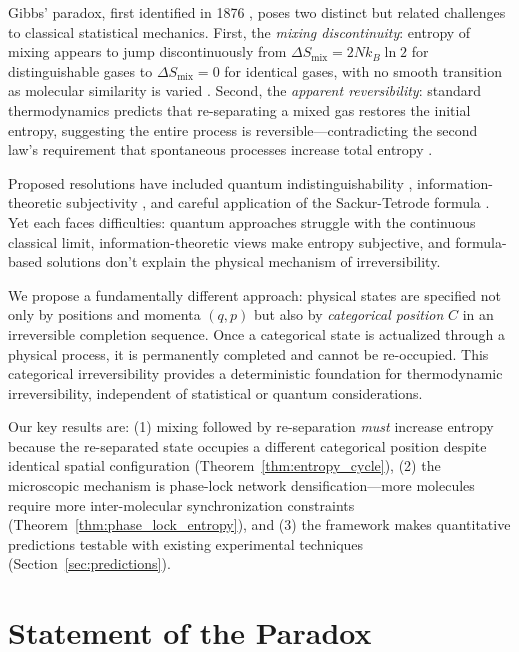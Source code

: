 \documentclass[twocolumn,superscriptaddress,prb,10pt]{revtex4-2}
\theoremstyle{definition}
\theoremstyle{remark}
\begin{document}
Gibbs' paradox, first identified in 1876 \cite{gibbs1876}, poses two distinct but related challenges to classical statistical mechanics. First, the \emph{mixing discontinuity}: entropy of mixing appears to jump discontinuously from $\Delta S_{\text{mix}} = 2Nk_B \ln 2$ for distinguishable gases to $\Delta S_{\text{mix}} = 0$ for identical gases, with no smooth transition as molecular similarity is varied \cite{swendsen2008,dieks2011}. Second, the \emph{apparent reversibility}: standard thermodynamics predicts that re-separating a mixed gas restores the initial entropy, suggesting the entire process is reversible—contradicting the second law's requirement that spontaneous processes increase total entropy \cite{allahverdyan2011}.

Proposed resolutions have included quantum indistinguishability \cite{bach1997,saunders2006}, information-theoretic subjectivity \cite{jaynes1992,hemmo1997}, and careful application of the Sackur-Tetrode formula \cite{denbigh1981,lin2015}. Yet each faces difficulties: quantum approaches struggle with the continuous classical limit, information-theoretic views make entropy subjective, and formula-based solutions don't explain the physical mechanism of irreversibility.

We propose a fundamentally different approach: physical states are specified not only by positions and momenta $(q,p)$ but also by \emph{categorical position} $C$ in an irreversible completion sequence. Once a categorical state is actualized through a physical process, it is permanently completed and cannot be re-occupied. This categorical irreversibility provides a deterministic foundation for thermodynamic irreversibility, independent of statistical or quantum considerations.

Our key results are: (1) mixing followed by re-separation \emph{must} increase entropy because the re-separated state occupies a different categorical position despite identical spatial configuration (Theorem~\ref{thm:entropy_cycle}), (2) the microscopic mechanism is phase-lock network densification—more molecules require more inter-molecular synchronization constraints (Theorem~\ref{thm:phase_lock_entropy}), and (3) the framework makes quantitative predictions testable with existing experimental techniques (Section~\ref{sec:predictions}).

\section{Statement of the Paradox}
\end{document}
